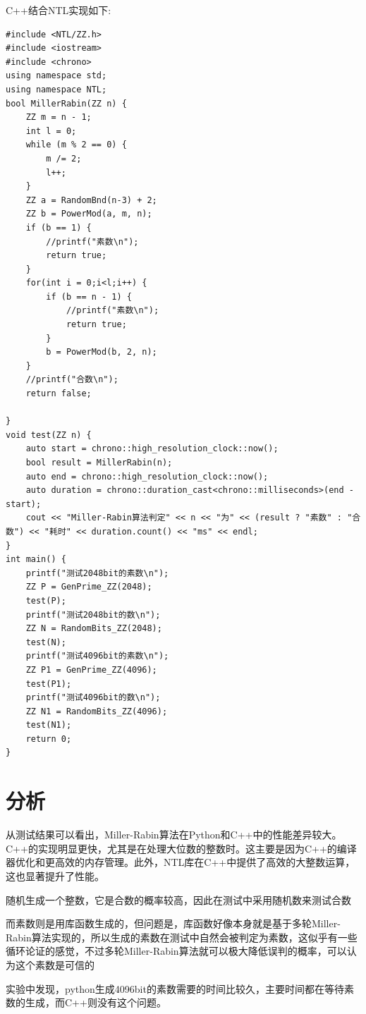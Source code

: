 \documentclass[12pt,a4paper]{article}
\begin{document}
C++结合NTL实现如下:
\begin{lstlisting}[style=mycpp]
#include <NTL/ZZ.h>
#include <iostream>
#include <chrono>
using namespace std;
using namespace NTL;
bool MillerRabin(ZZ n) {
    ZZ m = n - 1;
    int l = 0;
    while (m % 2 == 0) {
        m /= 2;
        l++;
    }
    ZZ a = RandomBnd(n-3) + 2;
    ZZ b = PowerMod(a, m, n);
    if (b == 1) {
        //printf("素数\n");
        return true;
    }
    for(int i = 0;i<l;i++) {
        if (b == n - 1) {
            //printf("素数\n");
            return true;
        }
        b = PowerMod(b, 2, n);
    }
    //printf("合数\n");
    return false;

}
void test(ZZ n) {
    auto start = chrono::high_resolution_clock::now();
    bool result = MillerRabin(n);
    auto end = chrono::high_resolution_clock::now();
    auto duration = chrono::duration_cast<chrono::milliseconds>(end - start);
    cout << "Miller-Rabin算法判定" << n << "为" << (result ? "素数" : "合数") << "耗时" << duration.count() << "ms" << endl;
}
int main() {
    printf("测试2048bit的素数\n");
    ZZ P = GenPrime_ZZ(2048);
    test(P);
    printf("测试2048bit的数\n");
    ZZ N = RandomBits_ZZ(2048);
    test(N);
    printf("测试4096bit的素数\n");
    ZZ P1 = GenPrime_ZZ(4096);
    test(P1);
    printf("测试4096bit的数\n");
    ZZ N1 = RandomBits_ZZ(4096);
    test(N1);
    return 0;
}
\end{lstlisting}
\thispagestyle{fancy} %
\section*{分析}
从测试结果可以看出，Miller-Rabin算法在Python和C++中的性能差异较大。C++的实现明显更快，尤其是在处理大位数的整数时。这主要是因为C++的编译器优化和更高效的内存管理。此外，NTL库在C++中提供了高效的大整数运算，这也显著提升了性能。

随机生成一个整数，它是合数的概率较高，因此在测试中采用随机数来测试合数

而素数则是用库函数生成的，但问题是，库函数好像本身就是基于多轮Miller-Rabin算法实现的，所以生成的素数在测试中自然会被判定为素数，这似乎有一些循环论证的感觉，不过多轮Miller-Rabin算法就可以极大降低误判的概率，可以认为这个素数是可信的

实验中发现，python生成4096bit的素数需要的时间比较久，主要时间都在等待素数的生成，而C++则没有这个问题。
\end{document}
